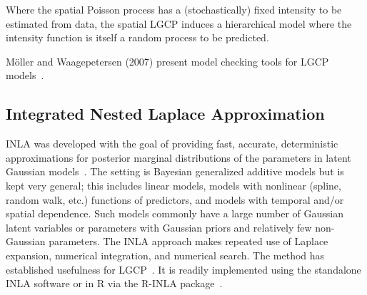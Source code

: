 \documentclass[]{interact}
\begin{document}
Where the spatial Poisson process has a (stochastically) fixed intensity to be
estimated from data, the spatial LGCP induces a hierarchical model where the
intensity function is itself a random process to be predicted.


M\"{o}ller and Waagepetersen (2007) present model checking tools for LGCP
models~\cite{moellerwaagepetersen}.


\subsection{Integrated Nested Laplace Approximation}

INLA was developed with the goal of providing fast, accurate, deterministic
approximations for posterior marginal distributions of the parameters in
latent Gaussian models~\cite{rueetal}. The setting is Bayesian generalized
additive models but is kept very general; this includes linear models, models
with nonlinear (spline, random walk, etc.) functions of predictors, and models
with temporal and/or spatial dependence. Such models commonly have a large
number of Gaussian latent variables or parameters with Gaussian priors and
relatively few non-Gaussian parameters. The INLA approach makes repeated use
of Laplace expansion, numerical integration, and numerical search. The method
has established usefulness for LGCP~\cite{illianetal}. It is readily
implemented using the standalone INLA software or in R via the
R-INLA package~\cite{inlar}.







\end{document}
